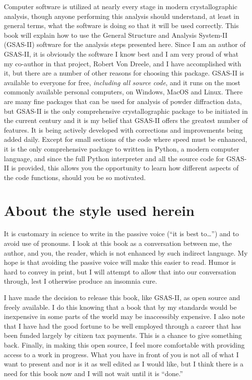  Computer software is utilized at nearly every stage in modern crystallographic analysis, though anyone performing this analysis should understand, at least in general terms, what the software is doing so that it will be used correctly. This book will explain how to use the General Structure and Analysis System-II (GSAS-II) software for the analysis steps presented here. Since I am an author of GSAS-II, it is obviously the software I know best and I am very proud of what my co-author in that project, Robert Von Dreele, and I have accomplished with it, but there are a number of other reasons for choosing this package. GSAS-II is available to everyone for free, \textit{including all source code}, and it runs on the most commonly available personal computers, on Windows, MacOS and Linux. There are many fine packages that can be used for analysis of powder diffraction data, but GSAS-II is the only comprehensive crystallographic package to be initiated in the current century and it is my belief that GSAS-II offers the greatest number of features. It is being actively developed with corrections and improvements being added daily. Except for small sections of the code where speed must be enhanced, it is the only comprehensive package to written in Python, a modern computer language, and since the full Python interpreter and all the source code for GSAS-II is provided, this allows you the opportunity to learn how different aspects of the code functions, should you be so motivated. 

 

\section*{About the style used herein}

 It is customary in science to write in the passive voice (“it is best to…”) and to avoid use of pronouns. I look at this book as a conversation between me, the author, and you, the reader, which is not enhanced by such indirect language. My hope is that avoiding the passive voice will make this easier to read. Humor is hard to convey in print, but I will attempt to allow that into our conversation through, lest I otherwise produce an insomnia cure. 

 I have made the decision to release this book, like GSAS-II, as open source and freely available. I do this knowing that a book that by my standards would be inexpensive in some parts of the world may be inaccessibly expensive. I also note that I have had the good fortune to be well employed through a career that has been funded largely by citizen tax payments. This is a chance to give something back. Finally, in making this open source, I feel more comfortable with providing access to a work in progress. What you have in front of you is not all of what I want to present and nor is it as well edited as I would like, but I think there is a need for this book now and I will not wait until it is “done.” 


